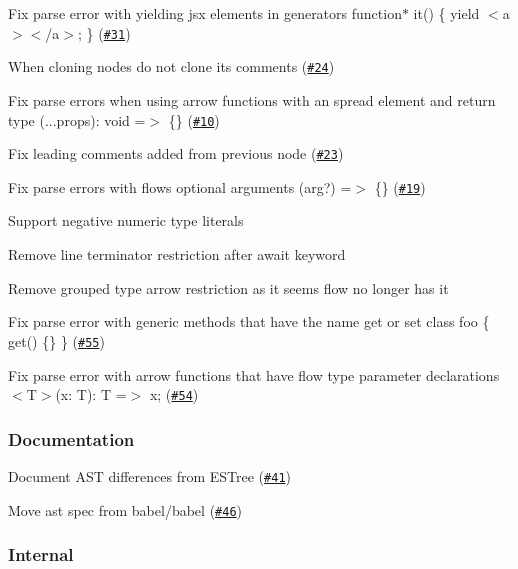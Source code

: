 \begin{DoxyItemize}
\item Fix parse error with yielding jsx elements in generators {\ttfamily function$\ast$ it() \{ yield $<$a$>$$<$/a$>$; \}} (\href{https://github.com/babel/babylon/pull/31}{\tt \#31}) 
\item When cloning nodes do not clone its comments (\href{https://github.com/babel/babylon/pull/24}{\tt \#24}) 
\item Fix parse errors when using arrow functions with an spread element and return type {\ttfamily (...props)\+: void =$>$ \{\}} (\href{https://github.com/babel/babylon/pull/10}{\tt \#10}) 
\item Fix leading comments added from previous node (\href{https://github.com/babel/babylon/pull/23}{\tt \#23}) 
\item Fix parse errors with flow\textquotesingle{}s optional arguments {\ttfamily (arg?) =$>$ \{\}} (\href{https://github.com/babel/babylon/pull/19}{\tt \#19}) 
\item Support negative numeric type literals 
\item Remove line terminator restriction after await keyword 
\item Remove grouped type arrow restriction as it seems flow no longer has it 
\item Fix parse error with generic methods that have the name {\ttfamily get} or {\ttfamily set} {\ttfamily class foo \{ get() \{\} \}} (\href{https://github.com/babel/babylon/pull/55}{\tt \#55}) 
\item Fix parse error with arrow functions that have flow type parameter declarations {\ttfamily $<$T$>$(x\+: T)\+: T =$>$ x;} (\href{https://github.com/babel/babylon/pull/54}{\tt \#54}) 
\end{DoxyItemize}

\subsubsection*{Documentation}


\begin{DoxyItemize}
\item Document A\+ST differences from E\+S\+Tree (\href{https://github.com/babel/babylon/pull/41}{\tt \#41}) 
\item Move ast spec from babel/babel (\href{https://github.com/babel/babylon/pull/46}{\tt \#46}) 
\end{DoxyItemize}

\subsubsection*{Internal}


